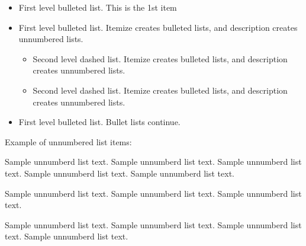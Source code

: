 \begin{itemize}
\item First level bulleted list. This is the 1st item
\item First level bulleted list. Itemize creates bulleted lists, and description creates unnumbered lists.

\begin{itemize}
\item Second level dashed list. Itemize creates bulleted lists, and description creates unnumbered lists.
\item Second level dashed list. Itemize creates bulleted lists, and description creates unnumbered lists.
\end{itemize}

\item First level bulleted list. Bullet lists continue.
\end{itemize}

\noindent
Example of unnumbered list items:

\begin{unlist}
\item Sample unnumberd list text. Sample unnumberd list text. Sample unnumberd list text. Sample unnumberd list text. Sample unnumberd list text.

\item Sample unnumberd list text. Sample unnumberd list text. Sample unnumberd list text.

\item Sample unnumberd list text. Sample unnumberd list text. Sample unnumberd list text. Sample unnumberd list text. 
\end{unlist}


